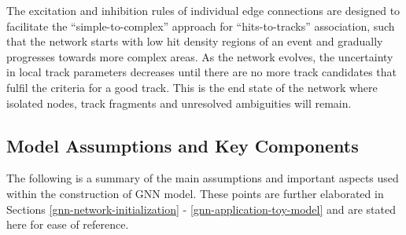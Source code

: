 The excitation and inhibition rules of individual edge connections are designed to facilitate the “simple-to-complex” approach for “hits-to-tracks” association, such that the network starts with low hit density regions of an event and gradually progresses towards more complex areas. As the network evolves, the uncertainty in local track parameters decreases until there are no more track candidates that fulfil the criteria for a good track. This is the end state of the network where isolated nodes, track fragments and unresolved ambiguities will remain.


\subsection{Model Assumptions and Key Components}
\label{chp5-model-assumptions}

The following is a summary of the main assumptions and important aspects used within the construction of GNN model. These points are further elaborated in Sections \ref{gnn-network-initialization} - \ref{gnn-application-toy-model} and are stated here for ease of reference.


